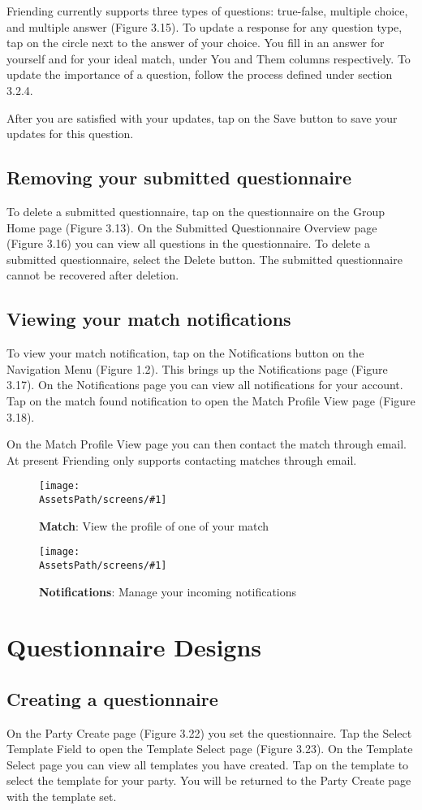 \documentclass[a4paper,11pt,titlepage]{scrartcl}
\newcommand{\textapp}[1]{{\fontfamily{cmss}\selectfont#1}}
\newcommand{\Friending}{\textapp{Friending}}
\newcommand*{\fileNotifications}{notifications}
\newcommand*{\fileMatch}{match}
\newcommand*{\AssetsPath}{../assets}%
\newcommand{\appscreenshot}[4]{
	\begin{figure}[ht!]%
	\label{#4}%
	\texttt{[image: \\AssetsPath/screens/\#1]}%
	\centering%
	\caption{\textbf{#2}: #3}%
	\end{figure}%
}
\begin{document}
\Friending{} currently supports three types of questions: true-false, multiple choice, and multiple answer (Figure 3.15).  To update a response for any question type, tap on the circle next to the answer of your choice.  You fill in an answer for yourself and for your ideal match, under You and Them columns respectively.   To update the importance of a question, follow the process defined under section 3.2.4.

After you are satisfied with your updates, tap on the Save button to save your updates for this question. 

\subsection{Removing your submitted questionnaire}
\label{sec:questionnaire-submitted-delete}
To delete a submitted questionnaire, tap on the questionnaire on the Group Home page (Figure 3.13). On the Submitted Questionnaire Overview page (Figure 3.16) you can view all questions in the questionnaire.  To delete a submitted questionnaire, select the Delete button.  The submitted questionnaire cannot be recovered after deletion.

\subsection{Viewing your match notifications}
\label{sec:questionnaire-matches}

To view your match notification, tap on the Notifications button on the Navigation Menu (Figure 1.2). This brings up the Notifications page (Figure 3.17).  On the Notifications page you can view all notifications for your account.  Tap on the match found notification to open the Match Profile View page (Figure 3.18).  

On the Match Profile View page you can then contact the match through email.  At present \Friending{} only supports contacting matches through email.

\appscreenshot{\fileMatch}{Match}{View the profile of one of your match}{fig:match}
\appscreenshot{\fileNotifications}{Notifications}{Manage your incoming notifications}{fig:notifications}

\clearpage
\section{Questionnaire Designs}
\label{sec:admin}

\subsection{Creating a questionnaire}
\label{sec:questionnaire-create}
On the Party Create page (Figure 3.22) you set the questionnaire.  Tap the Select Template Field to open the Template Select page (Figure 3.23).  On the Template Select page you can view all templates you have created.  Tap on the template to select the template for your party.  You will be returned to the Party Create page with the template set.
\end{document}
